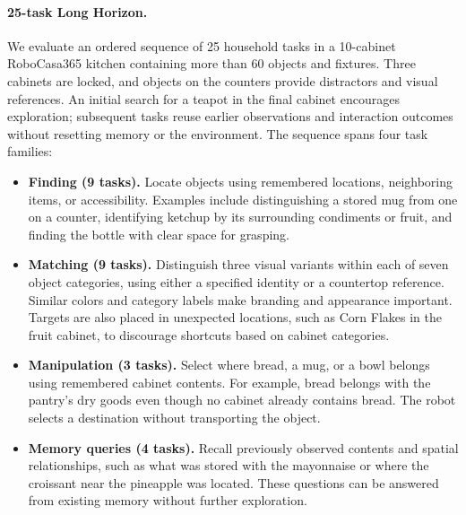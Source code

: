 \begingroup
\color{red}

\paragraph{25-task Long Horizon.}
We evaluate an ordered sequence of 25 household tasks in a 10-cabinet
RoboCasa365 kitchen containing more than 60 objects and fixtures. Three
cabinets are locked, and objects on the counters provide distractors and
visual references. An initial search for a teapot in the final cabinet
encourages exploration; subsequent tasks reuse earlier observations and
interaction outcomes without resetting memory or the environment. The
sequence spans four task families:

\begin{itemize}
\item \textbf{Finding (9 tasks).}
Locate objects using remembered locations, neighboring items, or
accessibility. Examples include distinguishing a stored mug from one on
a counter, identifying ketchup by its surrounding condiments or fruit,
and finding the bottle with clear space for grasping.

\item \textbf{Matching (9 tasks).}
Distinguish three visual variants within each of seven object categories,
using either a specified identity or a countertop reference. Similar
colors and category labels make branding and appearance important.
Targets are also placed in unexpected locations, such as Corn Flakes in
the fruit cabinet, to discourage shortcuts based on cabinet categories.

\item \textbf{Manipulation (3 tasks).}
Select where bread, a mug, or a bowl belongs using remembered cabinet
contents. For example, bread belongs with the pantry's dry goods even
though no cabinet already contains bread. The robot selects a destination
without transporting the object.

\item \textbf{Memory queries (4 tasks).}
Recall previously observed contents and spatial relationships, such as
what was stored with the mayonnaise or where the croissant near the
pineapple was located. These questions can be answered from existing
memory without further exploration.
\end{itemize}

\endgroup
